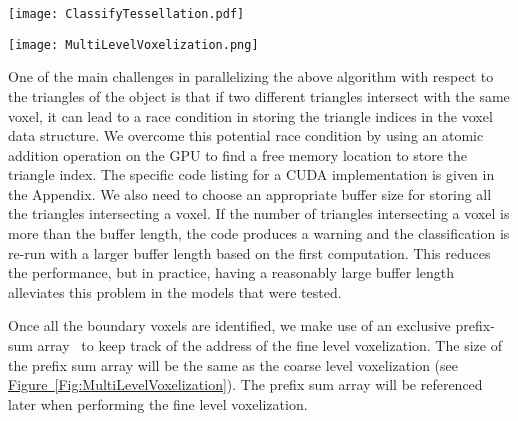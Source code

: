 \documentclass[10pt,letterpaper]{article}
\newcommand{\cref}[2]{\hyperref[#2]{#1~\ref*{#2}}}
\begin{document}
\begin{figure*}[t]
 \centering
 \texttt{[image: ClassifyTessellation.pdf]}
  \caption{Identifying the boundary voxels in 2D. The voxels in which the vertices of the triangle lie are first identified. The triangle is then intersected with the AABBs within the bounds along the 2 directions (marked in yellow) to identify all boundary voxels (green).}
 \label{Fig:ClassifyTessellation}
\end{figure*}

\begin{figure*}[h]
 \centering
 \texttt{[image: MultiLevelVoxelization.png]}
 \caption{Data structures for the multi-level voxelization.}
 \label{Fig:MultiLevelVoxelization}
\end{figure*}

One of the main challenges in parallelizing the above algorithm with respect to the triangles of the object is that if two different triangles intersect with the same voxel, it can lead to a race condition in storing the triangle indices in the voxel data structure. We overcome this potential race condition by using an atomic addition operation on the GPU to find a free memory location to store the triangle index. The specific code listing for a CUDA implementation is given in the Appendix. We also need to choose an appropriate buffer size for storing all the triangles intersecting a voxel. If the number of triangles intersecting a voxel is more than the buffer length, the code produces a warning and the classification is re-run with a larger buffer length based on the first computation. This reduces the performance, but in practice, having a reasonably large buffer length alleviates this problem in the models that were tested. 

Once all the boundary voxels are identified, we make use of an exclusive prefix-sum array~\cite{blelloch1990prefix} to keep track of the address of the fine level voxelization. The size of the prefix sum array will be the same as the coarse level voxelization (see \cref{Figure}{Fig:MultiLevelVoxelization}). The prefix sum array will be referenced later when performing the fine level voxelization.
\end{document}
